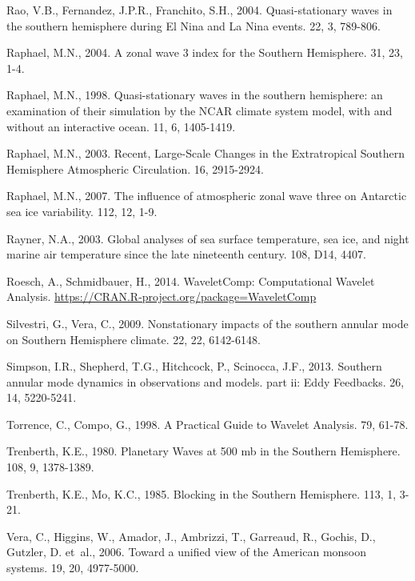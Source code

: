 \documentclass[spanish,a4paper,12pt,oneside]{book}
\begin{document}
\hypertarget{ref-Rao2004}{}
Rao, V.B., Fernandez, J.P.R., Franchito, S.H., 2004. Quasi-stationary
waves in the southern hemisphere during El Nina and La Nina events. 22,
3, 789-806.

\hypertarget{ref-Raphael2004}{}
Raphael, M.N., 2004. A zonal wave 3 index for the Southern Hemisphere.
31, 23, 1-4.

\hypertarget{ref-Raphael1998}{}
Raphael, M.N., 1998. Quasi-stationary waves in the southern hemisphere:
an examination of their simulation by the NCAR climate system model,
with and without an interactive ocean. 11, 6, 1405-1419.

\hypertarget{ref-Raphael2003}{}
Raphael, M.N., 2003. Recent, Large-Scale Changes in the Extratropical
Southern Hemisphere Atmospheric Circulation. 16, 2915-2924.

\hypertarget{ref-Raphael2007}{}
Raphael, M.N., 2007. The influence of atmospheric zonal wave three on
Antarctic sea ice variability. 112, 12, 1-9.

\hypertarget{ref-Rayner2003}{}
Rayner, N.A., 2003. Global analyses of sea surface temperature, sea ice,
and night marine air temperature since the late nineteenth century. 108,
D14, 4407.

\hypertarget{ref-R-WaveletComp}{}
Roesch, A., Schmidbauer, H., 2014. WaveletComp: Computational Wavelet
Analysis. \url{https://CRAN.R-project.org/package=WaveletComp}

\hypertarget{ref-Silvestri2009}{}
Silvestri, G., Vera, C., 2009. Nonstationary impacts of the southern
annular mode on Southern Hemisphere climate. 22, 22, 6142-6148.

\hypertarget{ref-Simpson2013}{}
Simpson, I.R., Shepherd, T.G., Hitchcock, P., Scinocca, J.F., 2013.
Southern annular mode dynamics in observations and models. part ii: Eddy
Feedbacks. 26, 14, 5220-5241.

\hypertarget{ref-Torrence1998}{}
Torrence, C., Compo, G., 1998. A Practical Guide to Wavelet Analysis.
79, 61-78.

\hypertarget{ref-Trenberth1980a}{}
Trenberth, K.E., 1980. Planetary Waves at 500 mb in the Southern
Hemisphere. 108, 9, 1378-1389.

\hypertarget{ref-Trenberth1985}{}
Trenberth, K.E., Mo, K.C., 1985. Blocking in the Southern Hemisphere.
113, 1, 3-21.

\hypertarget{ref-Vera2006}{}
Vera, C., Higgins, W., Amador, J., Ambrizzi, T., Garreaud, R., Gochis,
D., Gutzler, D. et~al., 2006. Toward a unified view of the American
monsoon systems. 19, 20, 4977-5000.
\end{document}

